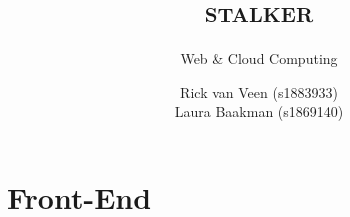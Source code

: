 \documentclass{report}
\title{\textsc{stalker}}
\subtitle{Web \& Cloud Computing}
\author{Rick van Veen (s1883933)\\Laura Baakman (s1869140)}
\begin{document}

% 

\chapter{Front-End}
\label{ch:frontend}


% 

% 

\printbibliography
\end{document}
